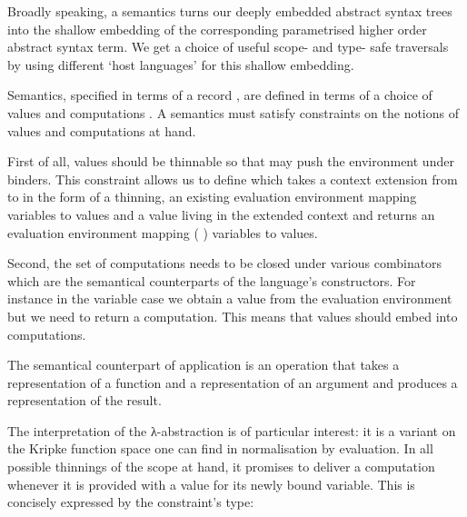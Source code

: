 
Broadly speaking, a semantics turns our deeply embedded abstract syntax
trees into the shallow embedding of the corresponding parametrised higher
order abstract syntax term. We get a choice of useful scope- and type- safe
traversals by using different `host languages' for this shallow embedding.

Semantics, specified in terms of a record \semrec{}, are defined in terms
of a choice of values  and computations . A semantics must
satisfy constraints on the notions of values  and computations 
at hand.

\label{section:lamsem}

First of all, values should be thinnable so that \semfun{} may push the
environment under binders. This constraint allows us to define 
which takes a context extension from  to  in the form of a
thinning, an existing evaluation environment mapping  variables to
 values and a value living in the extended context  and returns
an evaluation environment mapping ({  }) variables to
 values.



Second, the set of computations needs to be closed under various
combinators which are the semantical counterparts of the language's
constructors.
For instance in the variable case we obtain a value from the evaluation
environment but we need to return a computation. This means that values
should embed into computations.


The semantical counterpart of application is an operation that takes a
representation of a function and a representation of an argument and
produces a representation of the result.


The interpretation of the λ-abstraction is of particular interest:
it is a variant on the Kripke function space one can find in normalisation
by evaluation. In all possible thinnings of the scope at hand, it promises
to deliver a computation whenever it is provided with a value for its newly
bound variable. This is concisely expressed by the constraint's type:

